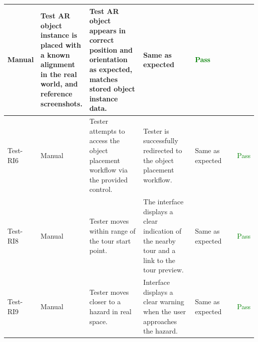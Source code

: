 \documentclass[12pt, titlepage]{article}
\begin{document}
\begin{table}[H]
{\begin{tabular}{|l|p{0.15\linewidth}|p{0.3\linewidth}|p{0.3\linewidth}|p{0.3\linewidth}|p{0.1\linewidth}|}
      Manual                                                                                                       &
      Test AR object instance is placed with a known alignment in the real world, and reference screenshots.       &
      Test AR object appears in correct position and orientation as expected, matches stored object instance data. &
      Same as expected                                                                                             &
      \textcolor{Green}{Pass}                                                                                        \\
      \hline
      Test-RI6                                                                                                     &
      Manual                                                                                                       &
      Tester attempts to access the object placement workflow via the provided control.                            &
      Tester is successfully redirected to the object placement workflow.                                          &
      Same as expected                                                                                             &
      \textcolor{Green}{Pass}                                                                                        \\
      \hline
      Test-RI8                                                                                                     &
      Manual                                                                                                       &
      Tester moves within range of the tour start point.                                                           &
      The interface displays a clear indication of the nearby tour and a link to the tour preview.                 &
      Same as expected                                                                                             &
      \textcolor{Green}{Pass}                                                                                        \\
      \hline
      Test-RI9                                                                                                     &
      Manual                                                                                                       &
      Tester moves closer to a hazard in real space.                                                               &
      Interface displays a clear warning when the user approaches the hazard.                                      &
      Same as expected                                                                                             &
      \textcolor{Green}{Pass}                                                                                        \\
      \hline
    \end{tabular}}
  \label{table:Realm_Interface_Tests}
\end{table}
\end{document}

